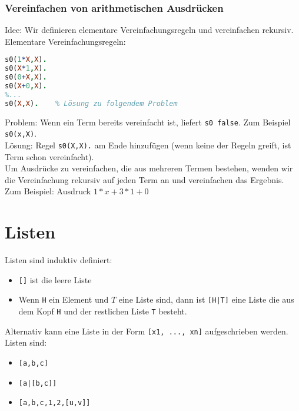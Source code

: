 \subsubsection{Vereinfachen von arithmetischen Ausdrücken}
Idee: Wir definieren elementare Vereinfachungsregeln und vereinfachen rekursiv.\\
Elementare Vereinfachungsregeln:
\begin{lstlisting}[language=Prolog]
s0(1*X,X).
s0(X*1,X).
s0(0+X,X).
s0(X+0,X).
%...
s0(X,X).	% Lösung zu folgendem Problem
\end{lstlisting}
Problem: Wenn ein Term bereits vereinfacht ist, liefert \lstinline$s0 false$. Zum Beispiel \lstinline$s0(x,X)$.\\
Lösung: Regel \lstinline$s0(X,X).$ am Ende hinzufügen (wenn keine der Regeln greift, ist Term schon vereinfacht).\\
Um Ausdrücke zu vereinfachen, die aus mehreren Termen bestehen, wenden wir die Vereinfachung rekursiv auf jeden Term an und vereinfachen das Ergebnis. Zum Beispiel: Ausdruck $1*x+3*1+0$
\begin{center}
\end{center}

\section{Listen}
Listen sind induktiv definiert:
\begin{itemize}
\item \lstinline$[]$ ist die leere Liste
\item Wenn \lstinline$H$ ein Element und $T$ eine Liste sind, dann ist \lstinline$[H|T]$ eine Liste die aus dem Kopf \lstinline$H$ und der restlichen Liste \lstinline$T$ besteht.
\end{itemize}
Alternativ kann eine Liste in der Form \lstinline$[x1, ..., xn]$ aufgeschrieben werden.
 Listen sind:
\begin{itemize}
\item \lstinline$[a,b,c]$
\item \lstinline$[a|[b,c]]$
\item \lstinline$[a,b,c,1,2,[u,v]]$
\end{itemize}
